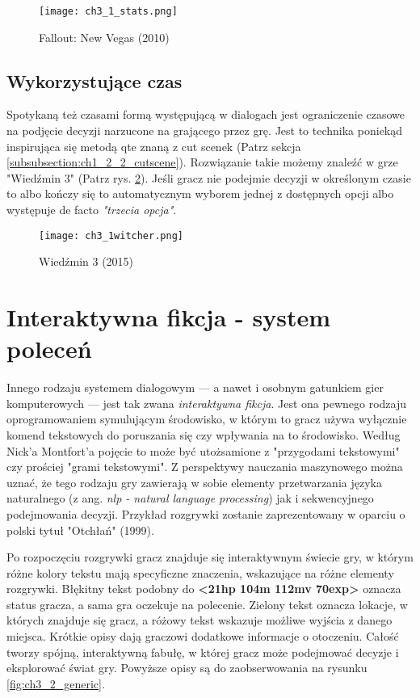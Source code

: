 \begin{figure}[h]
    \texttt{[image: ch3\_1\_stats.png]}
    \caption{Fallout: New Vegas (2010)}
    \centering
    \label{fig:ch3_1_stats}
\end{figure}

\newpage

\subsection{Wykorzystujące czas}

Spotykaną też czasami formą występującą w dialogach jest ograniczenie czasowe na podjęcie decyzji
narzucone na grającego przez grę. Jest to technika poniekąd inspirująca się metodą \gls{qte} znaną z
cut scenek (Patrz sekcja \ref{subsubsection:ch1_2_2_cutscene}). Rozwiązanie takie możemy znaleźć
w grze "Wiedźmin 3" (Patrz rys. \ref{fig:ch3_1_time}). Jeśli gracz nie podejmie decyzji w
określonym czasie to albo kończy się to automatycznym wyborem jednej z dostępnych opcji albo
występuje de facto \textit{"trzecia opcja"}.

\begin{figure}[h]
    \texttt{[image: ch3\_1witcher.png]}
    \caption{Wiedźmin 3 (2015)}
    \centering
    \label{fig:ch3_1_time}
\end{figure}

\section{Interaktywna fikcja - system poleceń}\label{subsection:ch3_2}

Innego rodzaju systemem dialogowym --- a nawet i osobnym gatunkiem gier komputerowych --- jest
tak zwana \textit{interaktywna fikcja}. Jest ona pewnego rodzaju oprogramowaniem symulującym
środowisko, w którym to gracz używa wyłącznie komend tekstowych do poruszania się czy wpływania
na to środowisko\cite{if_wiki}. Według Nick'a Montfort'a pojęcie to może być utożsamione z
"przygodami tekstowymi" czy prościej "grami tekstowymi"\cite{IF_4th_era}. Z perspektywy nauczania
maszynowego można uznać, że tego rodzaju gry zawierają w sobie elementy przetwarzania języka
naturalnego (z ang. \textit{\gls{nlp} - natural language processing}) jak i sekwencyjnego podejmowania
decyzji\cite{hausknecht2020interactive}. Przykład rozgrywki zostanie zaprezentowany w oparciu
o polski tytuł "Otchłań" (1999).

Po rozpoczęciu rozgrywki gracz znajduje się interaktywnym świecie gry, w którym różne kolory tekstu
mają specyficzne znaczenia, wskazujące na różne elementy rozgrywki. Błękitny tekst podobny do
\textbf{<21hp 104m 112mv 70exp>} oznacza status gracza, a sama gra oczekuje na polecenie.
Zielony tekst oznacza lokacje, w których znajduje się gracz, a różowy tekst wskazuje możliwe
wyjścia z danego miejsca. Krótkie opisy dają graczowi dodatkowe informacje o otoczeniu. Całość
tworzy spójną, interaktywną fabułę, w której gracz może podejmować decyzje i eksplorować świat gry.
Powyższe opisy są do zaobserwowania na rysunku \ref{fig:ch3_2_generic}.

